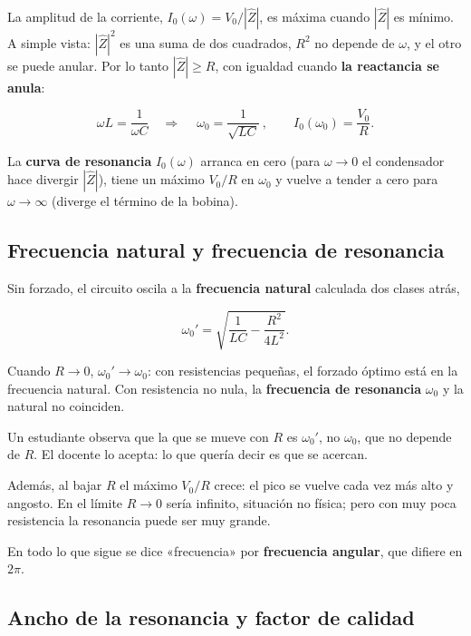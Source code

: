\documentclass[12pt,a4paper]{article}
\begin{document}
La amplitud de la corriente, $I_0(\omega) = V_0/|\hat Z|$, es máxima cuando
$|\hat Z|$ es mínimo. A simple vista: $|\hat Z|^2$ es una suma de dos
cuadrados, $R^2$ no depende de $\omega$, y el otro se puede anular. Por lo
tanto $|\hat Z|\ge R$, con igualdad cuando \textbf{la reactancia se anula}:

\[
\omega L = \frac{1}{\omega C}
\quad\Longrightarrow\quad
\boxed{\ \omega_0 = \frac{1}{\sqrt{LC}}\ },
\qquad
I_0(\omega_0) = \frac{V_0}{R}.
\]

La \textbf{curva de resonancia} $I_0(\omega)$ arranca en cero (para $\omega\to0$ el
condensador hace divergir $|\hat Z|$), tiene un máximo $V_0/R$ en $\omega_0$ y
vuelve a tender a cero para $\omega\to\infty$ (diverge el término de la
bobina).

\subsection{Frecuencia natural y frecuencia de resonancia}

Sin forzado, el circuito oscila a la \textbf{frecuencia natural} calculada dos
clases atrás,

\[
\omega_0' = \sqrt{\frac{1}{LC}-\frac{R^2}{4L^2}} .
\]

Cuando $R\to0$, $\omega_0'\to\omega_0$: con resistencias pequeñas, el forzado
óptimo está en la frecuencia natural. Con resistencia no nula, la \textbf{frecuencia
de resonancia} $\omega_0$ y la natural no coinciden.

\begin{notebox}
Un estudiante observa que la que se mueve con $R$ es $\omega_0'$, no
$\omega_0$, que no depende de $R$. El docente lo acepta: lo que quería decir es
que se acercan.
\end{notebox}

Además, al bajar $R$ el máximo $V_0/R$ crece: el pico se vuelve cada vez más
alto y angosto. En el límite $R\to0$ sería infinito, situación no física; pero
con muy poca resistencia la resonancia puede ser muy grande.

\begin{notebox}
En todo lo que sigue se dice «frecuencia» por
\textbf{frecuencia angular}, que difiere en $2\pi$.
\end{notebox}

\subsection{Ancho de la resonancia y factor de calidad}
\end{document}
